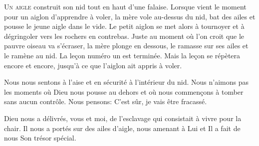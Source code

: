 


\lettrine{U}{n aigle} construit son nid tout en haut d'une falaise.
 Lorsque vient le moment pour un aiglon d'apprendre à voler,
 la mère vole au-dessus du nid, bat des ailes et
 pousse le jeune aigle dans le vide.
 Le petit aiglon se met alors à tournoyer et à dégringoler
 vers les rochers en contrebas.
 Juste au moment où l'on croit que le pauvre oiseau va s'écraser,
 la mère plonge en dessous, le ramasse sur ses ailes
 et le ramène au nid.
 La le\c{c}on numéro un est terminée.
 Mais la le\c{c}on se répètera encore et encore,
 jusqu'à ce que l'aiglon ait appris à voler.

Nous nous sentons à l'aise et en sécurité à l'intérieur du nid.
 Nous n'aimons pas les moments où Dieu nous pousse au dehors
 et où nous commen\c{c}ons à tomber sans aucun contrôle.
 Nous pensons: \Og C'est sûr, je vais être fracassé. \Fg{}


Dieu nous a délivrés, vous et moi, de l'esclavage
 qui consistait à vivre pour la chair.
 Il nous a portés sur des ailes d'aigle, nous amenant à Lui
 et Il a fait de nous Son trésor spécial. 

\dvrule







